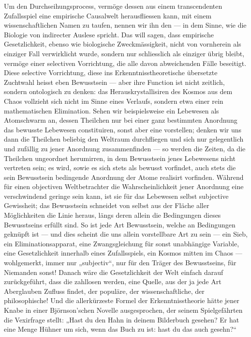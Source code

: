 Um den Durchseihungsprocess, vermöge dessen aus einem transcendenten Zufallsspiel eine empirische Causalwelt herausfliessen kann, mit einem wissenschaftlichen Namen zu taufen, nennen wir ihn den  — in dem Sinne, wie die Biologie von indirecter Auslese spricht. Das will sagen, dass empirische Gesetzlichkeit, ebenso wie biologische Zweckmässigkeit, nicht von vornherein als einziger Fall verwirklicht wurde, sondern nur schliesslich als einziger übrig bleibt, vermöge einer selectiven Vorrichtung, die alle davon abweichenden Fälle beseitigt. Diese selective Vorrichtung, diese ins Erkenntnisstheoretische übersetzte Zuchtwahl heisst eben Bewusstsein — aber ihre Function ist nicht zeitlich, sondern ontologisch zu denken: das Herauskrystallisiren des Kosmos aus dem Chaos vollzieht sich nicht im Sinne eines Verlaufs, sondern etwa einer rein mathematischen Elimination. Sehen wir beispielsweise ein Lebewesen als Atomschwarm an, dessen Theilchen nur bei einer ganz bestimmten Anordnung das bewusste Lebewesen constituiren, sonst aber eine  vorstellen; denken wir uns dann die Theilchen beliebig den Weltraum durchfliegen und sich nur gelegentlich und zufällig zu jener Anordnung zusammenfinden — so werden die Zeiten, da die Theilchen ungeordnet herumirren, in dem Bewusstsein jenes Lebewesens nicht vertreten sein; es wird, sowie es sich stets als bewusst vorfindet, auch stets die sein Bewusstsein bedingende Anordnung der Atome realisirt vorfinden. Während für einen objectiven Weltbetrachter die Wahrscheinlichkeit jener Anordnung eine verschwindend geringe sein kann, ist sie für das Lebewesen selbst subjective Gewissheit; das Bewusstsein schneidet von selbst aus der Fläche aller Möglichkeiten die Linie heraus, längs deren allein die Bedingungen dieses Bewusstseins erfüllt sind. So ist jede Art Bewusstsein, welche an Bedingungen geknüpft ist — und dies scheint die uns allein vorstellbare Art zu sein — ein Sieb, ein Eliminationsapparat, eine Zwangsgleichung für sonst unabhängige Variable, eine Gesetzlichkeit innerhalb eines Zufallsspiels, ein Kosmos mitten im Chaos — wohlgemerkt, immer nur „subjectiv“, nur für den Träger des Bewusstseins, für Niemanden sonst! Danach wäre die Gesetzlichkeit der Welt einfach darauf zurückgeführt, dass die zahllosen  werden, eine Quelle, aus der ja jede Art Aberglauben Zufluss findet, der populäre, der wissenschaftliche, der philosophische! Und die allerkürzeste Formel der Erkenntnisstheorie hätte jener Knabe in einer Björnson’schen Novelle ausgesprochen, der seinem Spielgefährten die Vexirfrage stellt: „Hast du den Hahn in deinem Bilderbuch gesehen? Er hat eine Menge Hühner um sich, wenn das Buch zu ist: hast du das auch gesehn?“
\par

